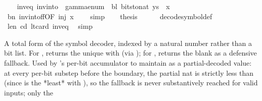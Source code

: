 \begin{isabellebody}
\ \ \isamarkupfalse%
\ inv{\isacharunderscore}{\kern0pt}eq{\isacharcolon}{\kern0pt}\ {\isachardoublequoteopen}inv{\isacharunderscore}{\kern0pt}into\ {\isasymGamma}\ {\isacharparenleft}{\kern0pt}gamma{\isacharunderscore}{\kern0pt}enum\ {\isasymGamma}\ bl{\isacharparenright}{\kern0pt}\ {\isacharparenleft}{\kern0pt}bits{\isacharunderscore}{\kern0pt}to{\isacharunderscore}{\kern0pt}nat\ {\isacharquery}{\kern0pt}ys{\isacharparenright}{\kern0pt}\ {\isacharequal}{\kern0pt}\ x{\isachardoublequoteclose}\isanewline
\ \ \ \ \isamarkupfalse%
\ bn\ inv{\isacharunderscore}{\kern0pt}into{\isacharunderscore}{\kern0pt}f{\isacharunderscore}{\kern0pt}f{\isacharbrackleft}{\kern0pt}OF\ inj\ {\isacartoucheopen}x\ {\isasymin}\ {\isasymGamma}{\isacartoucheclose}{\isacharbrackright}{\kern0pt}\ \isamarkupfalse%
\ simp\isanewline
\ \ \isamarkupfalse%
\ {\isacharquery}{\kern0pt}thesis\isanewline
\ \ \ \ \isamarkupfalse%
\ decode{\isacharunderscore}{\kern0pt}symbol{\isacharunderscore}{\kern0pt}def\isanewline
\ \ \ \ \isamarkupfalse%
\ len\ cd\ lt{\isacharunderscore}{\kern0pt}card\ inv{\isacharunderscore}{\kern0pt}eq\ \isamarkupfalse%
\ simp\isanewline
{}\isamarkupfalse%
%
\endisatagproof
{\isafoldproof}%
%
\isadelimproof
%
\endisadelimproof
%
\begin{isamarkuptext}%
A total form of the symbol decoder, indexed by a
  natural number rather than a bit list.  For , returns the unique  with
   (via );
  for , returns the blank
   as a defensive fallback.  Used by
  's per-bit accumulator to maintain
   as a partial-decoded  value: at
  every per-bit substep before the boundary, the partial nat is
  strictly less than 
  (since  is the *least* 
  with ), so the fallback is
  never substantively reached for valid inputs; only the

\end{isamarkuptext}
\end{isabellebody}
